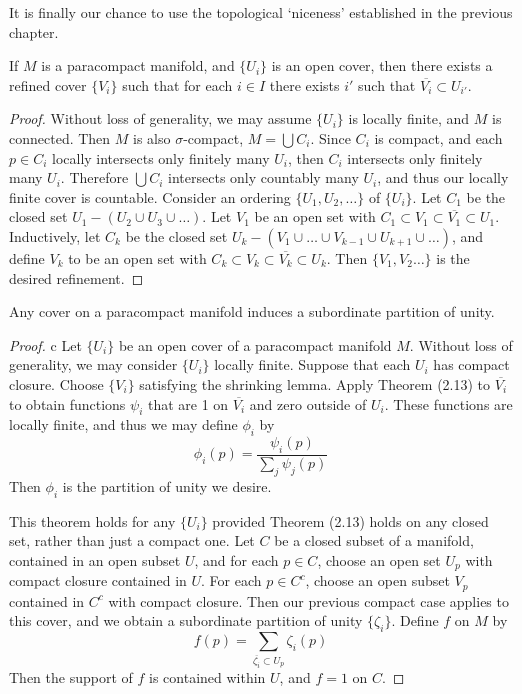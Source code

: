 It is finally our chance to use the topological `niceness' established in the previous chapter.

\begin{lemma}
    If $M$ is a paracompact manifold, and $\{ U_i \}$ is an open cover, then there exists a refined cover $\{ V_i \}$ such that for each $i \in I$ there exists $i'$ such that $\overline{V_i} \subset U_{i'}$.
\end{lemma}
\begin{proof}
    Without loss of generality, we may assume $\{ U_i \}$ is locally finite, and $M$ is connected. Then $M$ is also $\sigma$-compact, $M = \bigcup C_i$. Since $C_i$ is compact, and each $p \in C_i$ locally intersects only finitely many $U_i$, then $C_i$ intersects only finitely many $U_i$. Therefore $\bigcup C_i$ intersects only countably many $U_i$, and thus our locally finite cover is countable. Consider an ordering $\{ U_1, U_2, \dots \}$ of $\{ U_i \}$. Let $C_1$ be the closed set $U_1 - (U_2 \cup U_3 \cup \dots)$. Let $V_1$ be an open set with $C_1 \subset V_1 \subset \overline{V_1} \subset U_1$. Inductively, let $C_k$ be the closed set $U_k - (V_1 \cup \dots \cup V_{k-1} \cup U_{k+1} \cup \dots)$, and define $V_k$ to be an open set with $C_k \subset V_k \subset \overline{V_k} \subset U_k$. Then $\{ V_1, V_2 \dots \}$ is the desired refinement.
\end{proof}

\begin{theorem}
    Any cover on a paracompact manifold induces a subordinate partition of unity.
\end{theorem}
\begin{proof}c
    Let $\{ U_i \}$ be an open cover of a paracompact manifold $M$. Without loss of generality, we may consider $\{ U_i \}$ locally finite. Suppose that each $U_i$ has compact closure. Choose $\{ V_i \}$ satisfying the shrinking lemma. Apply Theorem (2.13) to $\overline{V_i}$ to obtain functions $\psi_i$ that are 1 on $\overline{V_i}$ and zero outside of $U_i$. These functions are locally finite, and thus we may define $\phi_i$ by
    \[ \phi_i(p) = \frac{\psi_i(p)}{\sum_j \psi_j(p)} \]
    Then $\phi_i$ is the partition of unity we desire.

    This theorem holds for any $\{ U_i \}$ provided Theorem (2.13) holds on any closed set, rather than just a compact one. Let $C$ be a closed subset of a manifold, contained in an open subset $U$, and for each $p \in C$, choose an open set $U_p$ with compact closure contained in $U$. For each $p \in C^c$, choose an open subset $V_p$ contained in $C^c$ with compact closure. Then our previous compact case applies to this cover, and we obtain a subordinate partition of unity $\{ \zeta_i \}$. Define $f$ on $M$ by
    \[ f(p) = \sum_{\overline{\zeta_i} \subset U_p} \zeta_i(p) \]
    Then the support of $f$ is contained within $U$, and $f = 1$ on $C$.
\end{proof}

